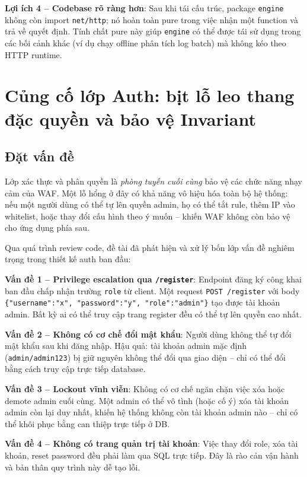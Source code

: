 \documentclass[../DoAn.tex]{subfiles}
\begin{document}
\textbf{Lợi ích 4 -- Codebase rõ ràng hơn}: Sau khi tái cấu trúc, package
\texttt{engine} không còn import \texttt{net/http}; nó hoàn toàn pure
trong việc nhận một function và trả về quyết định. Tính chất pure này
giúp \texttt{engine} có thể được tái sử dụng trong các bối cảnh khác (ví
dụ chạy offline phân tích log batch) mà không kéo theo HTTP runtime.

\section{Củng cố lớp Auth: bịt lỗ leo thang đặc quyền và bảo vệ Invariant}
\label{section:5.5}

\subsection{Đặt vấn đề}
\label{subsection:5.5.1}

Lớp xác thực và phân quyền là \textit{phòng tuyến cuối cùng} bảo vệ các
chức năng nhạy cảm của WAF. Một lỗ hổng ở đây có khả năng vô hiệu hóa
toàn bộ hệ thống: nếu một người dùng có thể tự lên quyền admin, họ có thể
tắt rule, thêm IP vào whitelist, hoặc thay đổi cấu hình theo ý muốn --
khiến WAF không còn bảo vệ cho ứng dụng phía sau.

Qua quá trình review code, đề tài đã phát hiện và xử lý bốn lớp vấn đề
nghiêm trọng trong thiết kế auth ban đầu:

\textbf{Vấn đề 1 -- Privilege escalation qua \texttt{/register}}: Endpoint
đăng ký công khai ban đầu chấp nhận trường \texttt{role} từ client. Một
request \texttt{POST /register} với body \texttt{\{"username":"x", "password":"y",
"role":"admin"\}} tạo được tài khoản admin. Bất kỳ ai có thể truy cập trang
register đều có thể tự lên quyền cao nhất.

\textbf{Vấn đề 2 -- Không có cơ chế đổi mật khẩu}: Người dùng không thể tự
đổi mật khẩu sau khi đăng nhập. Hậu quả: tài khoản admin mặc định
(\texttt{admin/admin123}) bị giữ nguyên không thể đổi qua giao diện -- chỉ
có thể đổi bằng cách truy cập trực tiếp database.

\textbf{Vấn đề 3 -- Lockout vĩnh viễn}: Không có cơ chế ngăn chặn việc xóa
hoặc demote admin cuối cùng. Một admin có thể vô tình (hoặc cố ý) xóa tài
khoản admin còn lại duy nhất, khiến hệ thống không còn tài khoản admin
nào -- chỉ có thể khôi phục bằng can thiệp trực tiếp ở DB.

\textbf{Vấn đề 4 -- Không có trang quản trị tài khoản}: Việc thay đổi role,
xóa tài khoản, reset password đều phải làm qua SQL trực tiếp. Đây là rào
cản vận hành và bản thân quy trình này dễ tạo lỗi.
\end{document}
